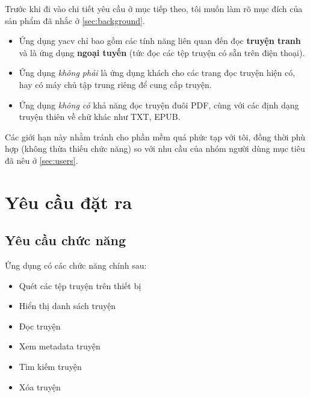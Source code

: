 \documentclass[../../thesis]{subfiles}
\begin{document}
Trước khi đi vào chi tiết yêu cầu ở mục tiếp theo, tôi muốn làm rõ mục đích của
sản phẩm đã nhắc ở \autoref{sec:background}.

\begin{itemize}
    \item
        Ứng dụng yacv chỉ bao gồm các tính năng liên quan đến đọc \textbf{truyện
        tranh} và là ứng dụng \textbf{ngoại tuyến} (tức đọc các tệp truyện có
        sẵn trên điện thoại).
    \item
        Ứng dụng \emph{không phải} là ứng dụng khách cho các trang đọc truyện
        hiện có, hay có máy chủ tập trung riêng để cung cấp truyện.
    \item
        Ứng dụng \emph{không có} khả năng đọc truyện đuôi PDF, cùng với các định
        dạng truyện thiên về chữ khác như TXT, EPUB.
\end{itemize}

Các giới hạn này nhằm tránh cho phần mềm quá phức tạp với tôi, đồng thời phù hợp
(không thừa thiếu chức năng) so với nhu cầu của nhóm người dùng mục tiêu đã nêu
ở \autoref{sec:users}.



\section{Yêu cầu đặt ra}\label{sec:requirements}

\subsection{Yêu cầu chức năng}\label{sec:functional-requirements}

Ứng dụng có các chức năng chính sau:

\begin{itemize}
    \item
        Quét các tệp truyện trên thiết bị
    \item
        Hiển thị danh sách truyện
    \item
        Đọc truyện
    \item
        Xem metadata truyện
    \item
        Tìm kiếm truyện
    \item
        Xóa truyện
\end{itemize}
\end{document}
